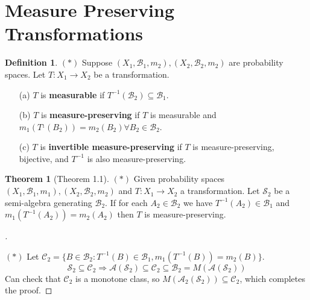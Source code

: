 \documentclass{article}
\theoremstyle{definition}
\newtheorem{thm}{Theorem}
\newtheorem{dfn}{Definition}
\newenvironment{proofs}[1][\proofname]{%
  \begin{proof}[#1]$ $\par\nobreak\ignorespaces
}{%
  \end{proof}
}
\newcommand{\Ra}{\Rightarrow}
\begin{document}
\section{Measure Preserving Transformations}

\begin{dfn}
	$(*)$
	Suppose $(X_1, \mathscr{B}_1, m_2), (X_2, \mathscr{B}_2, m_2)$ are probability spaces.
	Let $T: X_1 \to X_2$ be a transformation.
	\begin{enumerate}
		\item[(a)] $T$ is \textbf{measurable} if $T^{-1}(\mathscr{B}_2) \subseteq \mathscr{B}_1$.

		\item[(b)] $T$ is \textbf{measure-preserving} if $T$ is measurable and $m_1(T^{_1}(B_2)) = m_2(B_2) \forall B_2 \in \mathscr{B}_2$.

		\item[(c)] $T$ is \textbf{invertible measure-preserving} if $T$ is measure-preserving, bijective, and $T^{-1}$ is also measure-preserving.
	\end{enumerate}
\end{dfn}

\begin{thm}[Theorem 1.1]
	$(*)$
	Given probability spaces $(X_1, \mathscr{B}_1, m_1), (X_2, \mathscr{B}_2, m_2)$ and $T: X_1 \to X_2$ a transformation.
	Let $\mathscr{S}_2$ be a semi-algebra generating $\mathscr{B}_2$.
	If for each $A_2 \in \mathscr{B}_2$ we have $T^{-1}(A_2) \in \mathscr{B}_1$ and $m_1(T^{-1}(A_2)) = m_2(A_2)$ then $T$ is measure-preserving.
\end{thm}

\begin{proofs}
	$(*)$
	Let $\mathscr{C}_2 = \{B \in \mathscr{B}_2: T^{-1}(B) \in \mathscr{B}_1, m_1(T^{-1}(B)) = m_2(B)\}$.\\
	\[
		\mathscr{S}_2 \subseteq \mathscr{C}_2 \Ra \mathscr{A}(\mathscr{S}_2) \subseteq \mathscr{C}_2 \subseteq \mathscr{B}_2 = M(\mathscr{A}(\mathscr{S}_2))
	\]
	Can check that $\mathscr{C}_2$ is a monotone class, so $M(\mathscr{A}_2(\mathscr{S}_2)) \subseteq \mathscr{C}_2$, which completes the proof.
\end{proofs}
\end{document}

